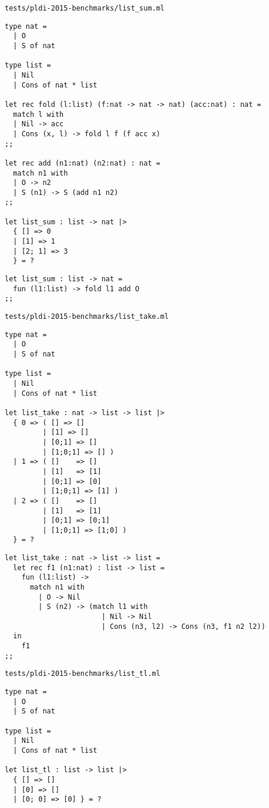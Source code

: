 \noindent\large\texttt{tests/pldi-2015-benchmarks/list\_sum.ml}
\begin{verbatim}
type nat =
  | O
  | S of nat

type list =
  | Nil
  | Cons of nat * list

let rec fold (l:list) (f:nat -> nat -> nat) (acc:nat) : nat =
  match l with
  | Nil -> acc
  | Cons (x, l) -> fold l f (f acc x)
;;

let rec add (n1:nat) (n2:nat) : nat =
  match n1 with
  | O -> n2
  | S (n1) -> S (add n1 n2)
;;

let list_sum : list -> nat |>
  { [] => 0
  | [1] => 1
  | [2; 1] => 3
  } = ?
\end{verbatim}

\begin{verbatim}
let list_sum : list -> nat =
  fun (l1:list) -> fold l1 add O
;;
\end{verbatim}

\noindent\large\texttt{tests/pldi-2015-benchmarks/list\_take.ml}
\begin{verbatim}
type nat =
  | O
  | S of nat

type list =
  | Nil
  | Cons of nat * list

let list_take : nat -> list -> list |>
  { 0 => ( [] => []
         | [1] => []
         | [0;1] => []
         | [1;0;1] => [] )
  | 1 => ( []    => []
         | [1]   => [1]
         | [0;1] => [0]
         | [1;0;1] => [1] )
  | 2 => ( []    => []
         | [1]   => [1]
         | [0;1] => [0;1]
         | [1;0;1] => [1;0] )
  } = ?
\end{verbatim}

\begin{verbatim}
let list_take : nat -> list -> list =
  let rec f1 (n1:nat) : list -> list =
    fun (l1:list) ->
      match n1 with
        | O -> Nil
        | S (n2) -> (match l1 with
                       | Nil -> Nil
                       | Cons (n3, l2) -> Cons (n3, f1 n2 l2))
  in
    f1
;;
\end{verbatim}

\noindent\large\texttt{tests/pldi-2015-benchmarks/list\_tl.ml}
\begin{verbatim}
type nat =
  | O
  | S of nat

type list =
  | Nil
  | Cons of nat * list

let list_tl : list -> list |>
  { [] => []
  | [0] => []
  | [0; 0] => [0] } = ?
\end{verbatim}

